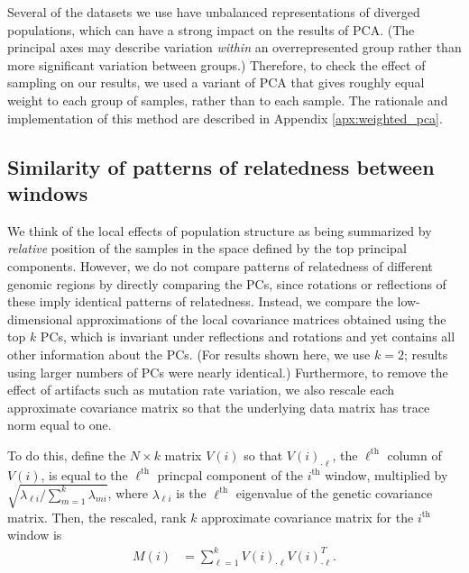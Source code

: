 \documentclass[11pt, oneside]{article}   	%
\begin{document}
Several of the datasets we use have unbalanced representations of diverged populations,
which can have a strong impact on the results of PCA.
(The principal axes may describe variation \emph{within} an overrepresented group
rather than more significant variation between groups.)
Therefore, to check the effect of sampling on our results,
we used a variant of PCA that gives roughly equal weight to each group of samples,
rather than to each sample.
The rationale and implementation of this method are described in Appendix \ref{apx:weighted_pca}.


\subsection{Similarity of patterns of relatedness between windows}

We think of the local effects of population structure as being summarized by \emph{relative} position of the samples
in the space defined by the top principal components.
However, 
we do not compare patterns of relatedness of different genomic regions by directly comparing the PCs,
since rotations or reflections of these imply identical patterns of relatedness.
Instead, we compare the low-dimensional approximations of the local covariance matrices
obtained using the top $k$ PCs,
which is invariant under reflections and rotations and yet contains all other information about the PCs.
(For results shown here, we use $k=2$;
results using larger numbers of PCs were nearly identical.)
Furthermore, to remove the effect of artifacts such as mutation rate variation,
we also rescale each approximate covariance matrix 
so that the underlying data matrix has trace norm equal to one.

To do this, define the $N \times k$ matrix $V(i)$ so that $V(i)_{\cdot \ell}$, 
the $\ell^\text{th}$ column of $V(i)$,
is equal to the $\ell^\text{th}$ princpal component of the $i^\text{th}$ window,
multiplied by $\sqrt{ \lambda_{\ell i} / \sum_{m=1}^k \lambda_{m i} }$,
where $\lambda_{\ell i}$ is the $\ell^\text{th}$ eigenvalue of the genetic covariance matrix.
Then, the rescaled, rank $k$ approximate covariance matrix for the $i^\text{th}$ window is
\begin{align} \label{eqn:est_cov}
    M(i) &= \sum_{\ell=1}^k V(i)_{\cdot \ell} V(i)_{\cdot \ell}^T .
\end{align}
\end{document}
